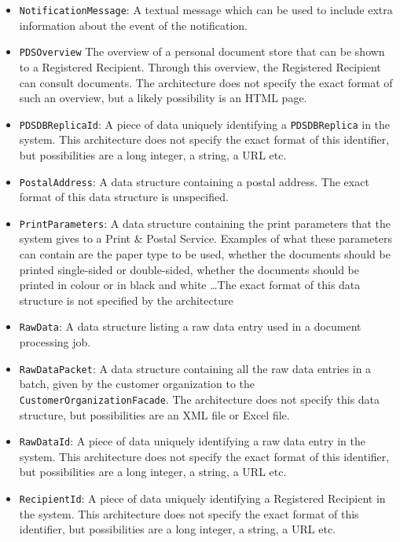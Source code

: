\documentclass[a4paper,10pt]{article}
\begin{document}
\begin{itemize}
    \item \texttt{NotificationMessage}: A textual message which can be used to include extra information about the event of the notification.
    
	\item \texttt{PDSOverview} The overview of a personal document store that can be shown to a Registered Recipient. Through this overview, the Registered Recipient can consult documents. The architecture does not specify the exact format of such an overview, but a likely possibility is an HTML page.
    
    \item \texttt{PDSDBReplicaId}:  A piece of data uniquely identifying a \texttt{PDSDBReplica} in the system. This architecture does not specify the exact format of this identifier, but possibilities are a long integer, a string, a URL etc.
    
	\item \texttt{PostalAddress}: A data structure containing a postal address. The exact format of this data structure is unspecified.
	
	\item \texttt{PrintParameters}: A data structure containing the print parameters that the system gives to a Print \& Postal Service. Examples of what these parameters can contain are the paper type to be used, whether the documents should be printed single-sided or double-sided, whether the documents should be printed in colour or in black and white \dots The exact format of this data structure is not specified by the architecture
	
    
    \item \texttt{RawData}: A data structure listing a raw data entry used in a document processing job.
    
    \item \texttt{RawDataPacket}: A data structure containing all the raw data entries in a batch, given by the customer organization to the \texttt{CustomerOrganizationFacade}. The architecture does not specify this data structure, but possibilities are an XML file or Excel file.
    
    \item \texttt{RawDataId}: A piece of data uniquely identifying a raw data entry in the system. This architecture does not specify the exact format of this identifier, but possibilities are a long integer, a string, a URL etc.
    
    \item \texttt{RecipientId}: A piece of data uniquely identifying a Registered Recipient in the system. This architecture does not specify the exact format of this identifier, but possibilities are a long integer, a string, a URL etc.
    

\end{itemize}
\end{document}
